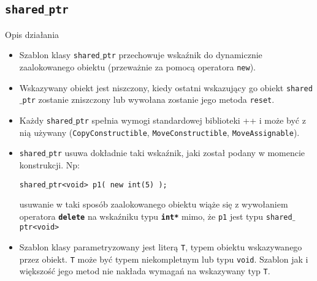 \subsection{\texttt{shared$\_$ptr}}
\begin{frame}[t]{Opis działania}
  \footnotesize
  {
    \begin{itemize}
      \item Szablon klasy \texttt{shared$\_$ptr} przechowuje wskaźnik do dynamicznie
        zaalokowanego obiektu (przeważnie za pomocą operatora \texttt{new}).
        \pause
        
      \item Wskazywany obiekt jest niszczony, kiedy ostatni wskazujący go obiekt      
        \texttt{shared$\_$ptr} zostanie zniszczony lub wywołana zostanie jego metoda 
        \texttt{reset}.
        \pause
      
      \item Każdy \texttt{shared$\_$ptr} spełnia wymogi standardowej biblioteki \C++
        i może być z nią używany (\texttt{CopyConstructible}, \texttt{MoveConstructible},
        \texttt{MoveAssignable}).  
        \pause
      
      \item \texttt{shared$\_$ptr} usuwa dokładnie taki wskaźnik, jaki został podany w
        momencie konstrukcji. Np:
      
        \texttt{shared$\_$ptr<void> p1( new int(5) );}
      
        usuwanie w taki sposób zaalokowanego obiektu wiąże się z wywołaniem operatora
        \texttt{\textbf{delete}} na wskaźniku typu \texttt{\textbf{int*}} mimo,
        że \texttt{p1} jest typu \texttt{shared$\_$ptr<void> }
        \pause
      
      \item Szablon klasy parametryzowany jest literą \texttt{T}, typem obiektu
        wskazywanego przez obiekt. \texttt{T} może być typem niekompletnym lub
        typu \texttt{void}. Szablon jak i większość jego metod nie nakłada wymagań na 
        wskazywany typ \texttt{T}.
    \end{itemize}
  }
\end{frame}

